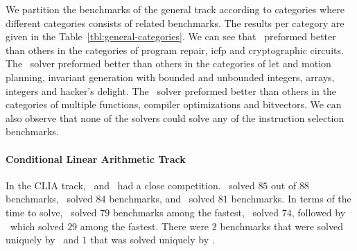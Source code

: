 We partition the benchmarks of the general track according to categories where different categories consists of related benchmarks.
The results per category are given in the Table~\ref{tbl:general-categories}.
We can see that \eusolvernew\ preformed better than others in the categories of program repair, icfp and cryptographic circuits.
The \cvcnew\ solver preformed better than others in the categories of let and motion planning, invariant generation with bounded and unbounded integers,
arrays, integers and hacker's delight. The \euphony\ solver preformed better than others in the categories of
multiple functions, compiler optimizations and bitvectors.
We can also observe that none of the solvers could solve any of the instruction selection benchmarks.



\paragraph{Conditional Linear Arithmetic Track}
In the CLIA track, \cvcnew\ and \dryd\ had a close competition.
\cvcnew\ solved $85$ out of $88$ benchmarks, \dryd\ solved $84$ benchmarks, and \eusolvernew\ solved $81$ benchmarks.
In terms of the time to solve, \dryd\ solved $79$ benchmarks among the fastest, \cvcnew\ solved $74$,
followed by \eusolvernew\ which solved $29$ among the fastest.
There were $2$ benchmarks that were solved uniquely by \dryd\ and $1$ that was solved uniquely by \cvcnew.

